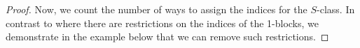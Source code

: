 \documentclass[11pt,reqno]{amsart}
\numberwithin{equation}{section}
\theoremstyle{plain}
\begin{document}
\begin{proof}

Now, we count the number of ways to assign the indices for the $S$-class. In contrast to \cite{split} where there are restrictions on the indices of the 1-blocks, we demonstrate in the example below that we can remove such restrictions.


\end{proof}
\end{document}
